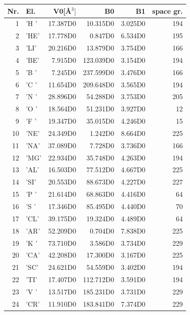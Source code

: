 \documentclass[11pt,a4paper]{report}
\begin{document}
\begin{table}[ht]
\begin{center}
\begin{tabular}{|r|l|r|r|r|r|}
\hline
Nr. & El. & V0[{\AA}$^3]$ & B0 & B1 & space gr.\\
\hline
  1 & 'H '&    17.387D0&    10.315D0&     3.025D0&194 \\
  2 & 'HE'&    17.778D0&     0.847D0&     6.534D0&195 \\
  3 & 'LI'&    20.216D0&    13.879D0&     3.754D0&166 \\
  4 & 'BE'&     7.915D0&   123.039D0&     3.154D0&194 \\
  5 & 'B '&     7.245D0&   237.599D0&     3.476D0&166 \\
  6 & 'C '&    11.654D0&   209.648D0&     3.565D0&194 \\
  7 & 'N '&    28.896D0&    54.288D0&     3.753D0&205 \\
  8 & 'O '&    18.564D0&    51.231D0&     3.927D0& 12 \\
  9 & 'F '&    19.347D0&    35.015D0&     4.246D0& 15 \\
 10 & 'NE'&    24.349D0&     1.242D0&     8.664D0&225 \\
 11 & 'NA'&    37.089D0&     7.728D0&     3.736D0&166 \\
 12 & 'MG'&    22.934D0&    35.748D0&     4.263D0&194 \\
 13 & 'AL'&    16.503D0&    77.512D0&     4.667D0&225 \\
 14 & 'SI'&    20.553D0&    88.673D0&     4.227D0&227 \\
 15 & 'P '&    21.614D0&    68.863D0&     4.416D0& 64 \\
 16 & 'S '&    17.346D0&    85.495D0&     4.440D0& 70 \\
 17 & 'CL'&    39.175D0&    19.324D0&     4.489D0& 64 \\
 18 & 'AR'&    52.209D0&     0.704D0&     7.838D0&225 \\
 19 & 'K '&    73.710D0&     3.586D0&     3.734D0&229 \\
 20 & 'CA'&    42.208D0&    17.300D0&     3.167D0&225 \\
 21 & 'SC'&    24.621D0&    54.559D0&     3.402D0&194 \\
 22 & 'TI'&    17.407D0&   112.712D0&     3.591D0&194 \\
 23 & 'V '&    13.517D0&   185.231D0&     3.731D0&229 \\
 24 & 'CR'&    11.910D0&   183.841D0&     7.374D0&229 \\

\end{tabular}
\end{center}
\end{table}
\end{document}

